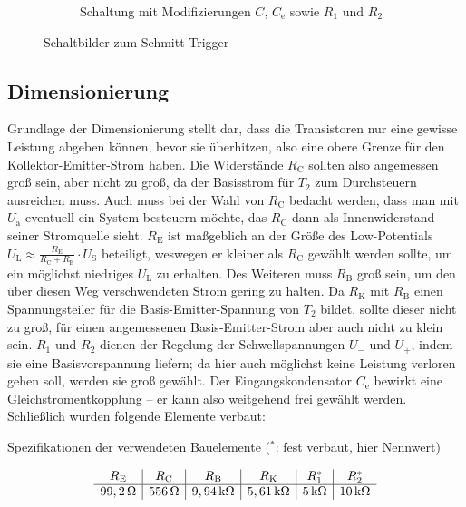 \documentclass[numbers=noenddot,10pt,a4paper]{scrartcl}
\newcommand{\ix}[1]{_\text{#1}}
\begin{document}
\begin{figure}[H]
\begin{subfigure}[b]{0.49\textwidth}
\caption{Schaltung mit Modifizierungen $C$, $C\ix{e}$ sowie $R_1$ und $R_2$}
\end{subfigure}
\caption{Schaltbilder zum Schmitt-Trigger}
\end{figure}
\subsection{Dimensionierung}
Grundlage der Dimensionierung stellt dar, dass die Transistoren nur eine gewisse Leistung abgeben können, bevor sie überhitzen, also eine obere Grenze für den Kollektor-Emitter-Strom haben. Die Widerstände $R\ix{C}$ sollten also angemessen groß sein, aber nicht zu groß, da der Basisstrom für $T_2$ zum Durchsteuern ausreichen muss. Auch muss bei der Wahl von $R\ix{C}$ bedacht werden, dass man mit $U\ix{a}$ eventuell ein System besteuern möchte, das $R\ix{C}$ dann als Innenwiderstand seiner Stromquelle sieht. $R\ix{E}$ ist maßgeblich an der Größe des Low-Potentials $U\ix{L}\approx\frac{R\ix{E}}{R\ix{C}+R\ix{E}}\cdot U\ix{S}$ beteiligt, weswegen er kleiner als $R\ix{C}$ gewählt werden sollte, um ein möglichst niedriges $U\ix{L}$ zu erhalten. Des Weiteren muss $R\ix{B}$ groß sein, um den über diesen Weg verschwendeten Strom gering zu halten. Da $R\ix{K}$ mit $R\ix{B}$ einen Spannungsteiler für die Basis-Emitter-Spannung von $T\ix{2}$ bildet, sollte dieser nicht zu groß, für einen angemessenen Basis-Emitter-Strom aber auch nicht zu klein sein. $R_1$ und $R_2$ dienen der Regelung der Schwellspannungen $U_-$ und $U_+$, indem sie eine Basisvorspannung liefern; da hier auch möglichst keine Leistung verloren gehen soll, werden sie groß gewählt. Der Eingangskondensator $C\ix{e}$ bewirkt eine Gleichstromentkopplung -- er kann also weitgehend frei gewählt werden. Schließlich wurden folgende Elemente verbaut:
\begin{table}[H]
\caption{Spezifikationen der verwendeten Bauelemente ($^*$: fest verbaut, hier Nennwert)}
\vspace{-1em}
\begin{align*}
\begin{array}{c|c|c|c|c|c}
R\ix{E} & R\ix{C} & R\ix{B} & R\ix{K} & R_1^* & R_2^* \\ \hline
\unit[99,2]{\Omega} & \unit[556]{\Omega} & \unit[9,94]{k\Omega} & \unit[5,61]{k\Omega} & \unit[5]{k\Omega} & \unit[10]{k\Omega}
\end{array} 
\end{align*}
\end{table}
\end{document}
